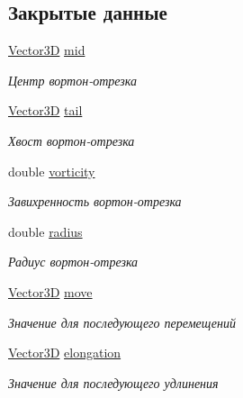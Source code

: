 \subsection*{Закрытые данные}
\begin{DoxyCompactItemize}
\item 
\mbox{\label{class_vorton_a5eeb07b517edbfc7345acf7a350c9ba8}} 
\mbox{\hyperlink{class_vector3_d}{Vector3D}} \mbox{\hyperlink{class_vorton_a5eeb07b517edbfc7345acf7a350c9ba8}{mid}}
\begin{DoxyCompactList}\small\item\em Центр вортон-\/отрезка \end{DoxyCompactList}\item 
\mbox{\label{class_vorton_a54fb015c1d89cafd12fdd63c05a075ed}} 
\mbox{\hyperlink{class_vector3_d}{Vector3D}} \mbox{\hyperlink{class_vorton_a54fb015c1d89cafd12fdd63c05a075ed}{tail}}
\begin{DoxyCompactList}\small\item\em Хвост вортон-\/отрезка \end{DoxyCompactList}\item 
\mbox{\label{class_vorton_aada2eb7dddb6d75f74115c5a124d335d}} 
double \mbox{\hyperlink{class_vorton_aada2eb7dddb6d75f74115c5a124d335d}{vorticity}}
\begin{DoxyCompactList}\small\item\em Завихренность вортон-\/отрезка \end{DoxyCompactList}\item 
\mbox{\label{class_vorton_a5317e36fcd205f223c1356ed45450781}} 
double \mbox{\hyperlink{class_vorton_a5317e36fcd205f223c1356ed45450781}{radius}}
\begin{DoxyCompactList}\small\item\em Радиус вортон-\/отрезка \end{DoxyCompactList}\item 
\mbox{\label{class_vorton_ad26886ad0d3e71c73795f2999db8becc}} 
\mbox{\hyperlink{class_vector3_d}{Vector3D}} \mbox{\hyperlink{class_vorton_ad26886ad0d3e71c73795f2999db8becc}{move}}
\begin{DoxyCompactList}\small\item\em Значение для последующего перемещений \end{DoxyCompactList}\item 
\mbox{\label{class_vorton_a39f42d1ca73735c21c67bb4e03a2a29f}} 
\mbox{\hyperlink{class_vector3_d}{Vector3D}} \mbox{\hyperlink{class_vorton_a39f42d1ca73735c21c67bb4e03a2a29f}{elongation}}
\begin{DoxyCompactList}\small\item\em Значение для последующего удлинения \end{DoxyCompactList}\end{DoxyCompactItemize}


